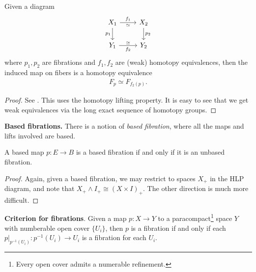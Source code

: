 \documentclass{article}[11pt]
\newcommand{\smashprod}{\wedge} %
\begin{document}
\begin{proposition} Given a diagram
\[
	\begin{tikzcd}
	X_1\rar["f_1" above, "\simeq" below]\dar["p_1" left] & X_2\dar["p_2" right] \\
	Y_1\rar["f_2" below,"\simeq" above] & Y_2
	\end{tikzcd}
\]
where $p_1,p_2$ are fibrations and $f_1,f_2$ are (weak) homotopy equivalences, then the induced map on fibers is a homotopy equivalence
\begin{align*}
	F_p \simeq F_{f_2(p)}.
\end{align*}
\end{proposition}
\begin{proof} See \cite[7.4]{may}. This uses the homotopy lifting property. It is easy to see that we get weak equivalences via the long exact sequence of homotopy groups.
\end{proof}

\textbf{Based fibrations.} There is a notion of \textit{based fibration}, where all the maps and lifts involved are based.

\begin{proposition} A based map $p : E \to B$ is a based fibration if and only if it is an unbased fibration.
\end{proposition}
\begin{proof} Again, given a based fibration, we may restrict to spaces $X_+$ in the HLP diagram, and note that $X_+ \smashprod I_+ \cong (X\times I)_+$. The other direction is much more difficult.
\end{proof}





\textbf{Criterion for fibrations}. Given a map $p : X\to Y$ to a paracompact\footnote{Every open cover admits a numerable refinement.} space $Y$ with numberable open cover $\{U_i\}$, then $p$ is a fibration if and only if each $\left. p\right|_{p^{-1}(U_i)} : p^{-1}(U_i) \to U_i$ is a fibration for each $U_i$.
\end{document}
